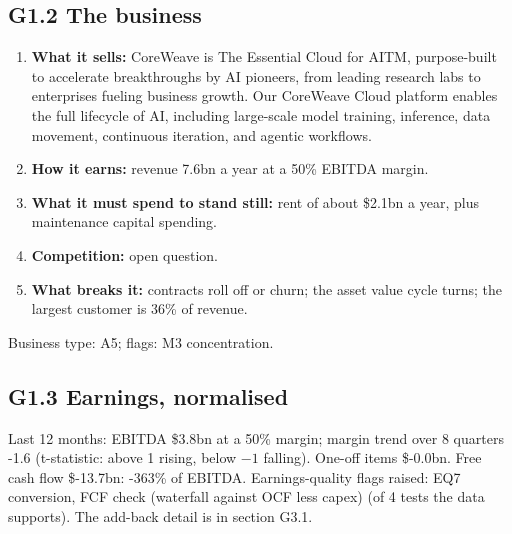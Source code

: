 \documentclass[11pt,a4paper]{article}
\begin{document}
\subsection*{G1.2 The business}
\begin{enumerate}
\item \textbf{What it sells:} CoreWeave is The Essential Cloud for AITM, purpose-built to accelerate breakthroughs by AI pioneers, from leading research labs to enterprises fueling business growth. Our CoreWeave Cloud platform enables the full lifecycle of AI, including large-scale model training, inference, data movement, continuous iteration, and agentic workflows.
\item \textbf{How it earns:} revenue 7.6bn a year at a 50\% EBITDA margin.
\item \textbf{What it must spend to stand still:} rent of about \$2.1bn a year, plus maintenance capital spending.
\item \textbf{Competition:} open question.
\item \textbf{What breaks it:} contracts roll off or churn; the asset value cycle turns; the largest customer is 36\% of revenue.
\end{enumerate}
Business type: A5; flags: M3 concentration.
\subsection*{G1.3 Earnings, normalised}
Last 12 months: EBITDA \$3.8bn at a 50\% margin; margin trend over 8 quarters -1.6 (t-statistic: above 1 rising, below $-1$ falling). One-off items \$-0.0bn. Free cash flow \$-13.7bn: -363\% of EBITDA. Earnings-quality flags raised: EQ7 conversion, FCF check (waterfall against OCF less capex) (of 4 tests the data supports). The add-back detail is in section G3.1.
\end{document}
